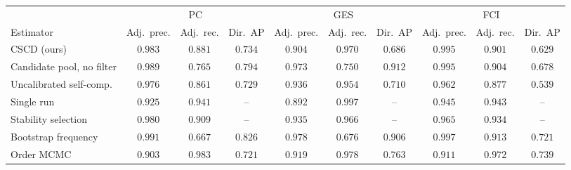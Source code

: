 \begin{tabular}{lccccccccc}
\toprule
 & \multicolumn{3}{c}{PC} & \multicolumn{3}{c}{GES} & \multicolumn{3}{c}{FCI} \\ \cmidrule(lr){2-4}\cmidrule(lr){5-7}\cmidrule(lr){8-10}
Estimator & Adj.\ prec. & Adj.\ rec. & Dir.\ AP & Adj.\ prec. & Adj.\ rec. & Dir.\ AP & Adj.\ prec. & Adj.\ rec. & Dir.\ AP \\
\midrule
CSCD (ours) & $0.983$ & $0.881$ & $0.734$ & $0.904$ & $0.970$ & $0.686$ & $0.995$ & $0.901$ & $0.629$ \\
\midrule
Candidate pool, no filter & $0.989$ & $0.765$ & $0.794$ & $0.973$ & $0.750$ & $0.912$ & $0.995$ & $0.904$ & $0.678$ \\
Uncalibrated self-comp. & $0.976$ & $0.861$ & $0.729$ & $0.936$ & $0.954$ & $0.710$ & $0.962$ & $0.877$ & $0.539$ \\
Single run & $0.925$ & $0.941$ & -- & $0.892$ & $0.997$ & -- & $0.945$ & $0.943$ & -- \\
Stability selection & $0.980$ & $0.909$ & -- & $0.935$ & $0.966$ & -- & $0.965$ & $0.934$ & -- \\
Bootstrap frequency & $0.991$ & $0.667$ & $0.826$ & $0.978$ & $0.676$ & $0.906$ & $0.997$ & $0.913$ & $0.721$ \\
Order MCMC & $0.903$ & $0.983$ & $0.721$ & $0.919$ & $0.978$ & $0.763$ & $0.911$ & $0.972$ & $0.739$ \\
\bottomrule
\end{tabular}

